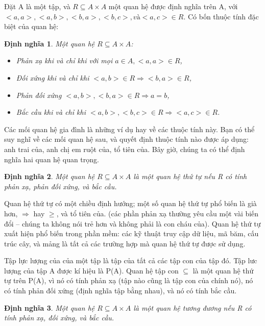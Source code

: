 \documentclass[11pt,a4paper,oneside]{article}
\newtheorem{modeling_def}{Định nghĩa }
\begin{document}
Đặt A là một tập, và $ R \subseteq A \times A $ một quan hệ được định nghĩa trên A, với $ <a,a>, <a,b>, <b,a>, <b,c>, và <a,c> \in R $. Có bốn thuộc tính đặc biệt của quan hệ:

\begin{modeling_def}
Một quan hệ $ R \subseteq A \times A $:\\
\begin{itemize}
\item Phản xạ khi và chỉ khi với mọi $ a \in A, <a,a> \in R $,
\item Đối xứng khi và chỉ khi $ <a,b> \in R \Rightarrow <b,a> \in R $,
\item Phản đối xứng $ <a,b>, <b,a> \in R \Rightarrow a=b $,
\item Bắc cầu khi và chỉ khi $ <a,b>, <b,c> \in R \Rightarrow <a,c> \in R $.
\end{itemize}
\end{modeling_def}

Các mối quan hệ gia đình là những ví dụ hay về các thuộc tính này. Bạn có thể
suy nghĩ về các mối quan hệ sau, và quyết định thuộc tính nào được áp dụng: anh trai của, anh chị em ruột của, tổ tiên của. Bây giờ, chúng ta có thể định nghĩa hai quan hệ quan trọng.

\begin{modeling_def}
Một quan hệ $ R \subseteq A \times A $ là một quan hệ thứ tự nếu R có tính phản xạ, phản đối xứng, và bắc cầu.
\end{modeling_def}

Quan hệ thứ tự có một chiều định hướng; một số quan hệ thứ tự phổ biến là già hơn, $ \Rightarrow $ hay $ \geq $, và tổ tiên của. (các phần phản xạ thường yêu cầu một vài biến đổi – chúng ta không nói trẻ hơn và không phải là con cháu của). Quan hệ thứ tự xuất hiện phổ biến trong phần mềm: các kỹ thuật truy cập dữ liệu, mã băm, cấu trúc cây, và mảng là tất cả các trường hợp mà quan hệ thứ tự được sử dụng.

Tập lực lượng của của một tập là tập của tất cả các tập con của tập đó. Tập lưc lượng của tập A được kí hiệu là P(A). Quan hệ tập con $ \subseteq $ là một quan hệ thứ tự trên P(A), vì nó có tính phản xạ (tập nào cũng là tập con của chính nó), nó có tính phản đối xứng (định nghĩa tập bằng nhau), và nó có tính bắc cầu.

\begin{modeling_def}
Một quan hệ $ R \subseteq A \times A $ là một quan hệ tương đương nếu R có tính phản xạ, đối xứng, và bắc cầu.
\end{modeling_def}
\end{document}
